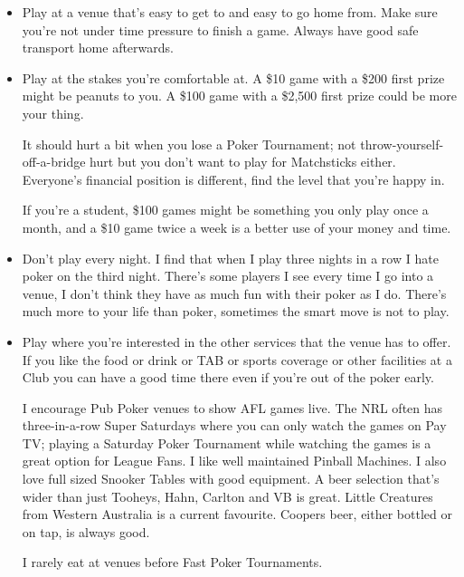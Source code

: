\begin{itemize}

\item Play at a venue that's easy to get to and easy to go home
from. Make sure you're not under time pressure to finish a game.
Always have good safe transport home afterwards.

\item Play at the stakes you're comfortable at. A \$10
game with a \$200 first prize might be peanuts to you.
A \$100 game with a \$2,500 first prize could be more your thing.

It should hurt a bit when you lose a Poker Tournament; not
throw-yourself-off-a-bridge hurt but you don't want to play for
Matchsticks either. Everyone's financial position is different,
find the level that you're happy in.

If you're a student, \$100 games might be something
you only play once a month, and a \$10 game twice a week is
a better use of your money and time.

\item Don't play every night. I find that when I play
three nights in a row I hate poker on the third
night. There's some players I see every time I go into a venue,
I don't think they have as much fun with their poker as I do.
There's much more to your life than poker, sometimes the smart
move is not to play.

\item Play where you're interested in the other services
that the venue has to offer. If you like the food or drink or
TAB or sports coverage or other facilities at a Club you can
have a good time there even if you're out of the poker early.

I encourage Pub Poker venues to show
AFL games live. The NRL often has three-in-a-row Super Saturdays
where you can only watch the games on Pay TV; playing a Saturday
Poker Tournament while watching the games is a great option
for League Fans. I like well maintained
Pinball Machines. I also love full sized Snooker Tables with good
equipment. A beer selection that's wider than
just Tooheys, Hahn, Carlton and VB is great. Little Creatures from Western
Australia is a current favourite. Coopers beer, either bottled
or on tap, is always good.

I rarely eat at venues before Fast Poker Tournaments.



\end{itemize}
